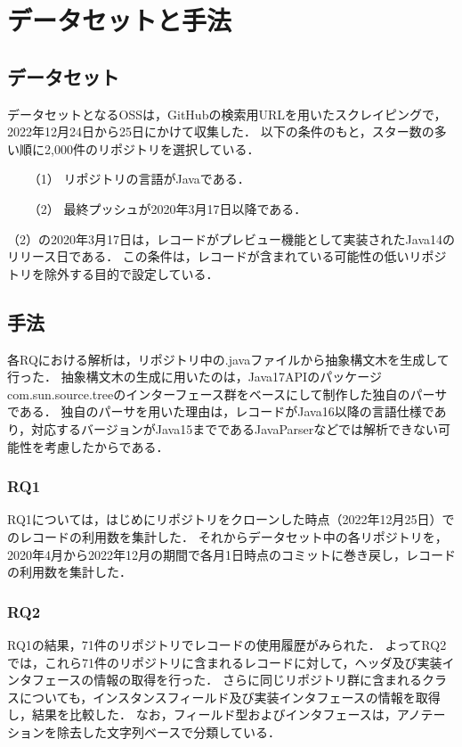 \section{データセットと手法\label{methodology}}

\subsection{データセット}
データセットとなるOSSは，GitHubの検索用URLを用いたスクレイピングで，2022年12月24日から25日にかけて収集した．
以下の条件のもと，スター数の多い順に2,000件のリポジトリを選択している．
\begin{itemize}
    \item[（1） ] リポジトリの言語がJavaである．
    \item[（2） ] 最終プッシュが2020年3月17日以降である．
\end{itemize}
（2）の2020年3月17日は，レコードがプレビュー機能として実装されたJava14のリリース日である．
この条件は，レコードが含まれている可能性の低いリポジトリを除外する目的で設定している．

\subsection{手法}
各RQにおける解析は，リポジトリ中の.javaファイルから抽象構文木を生成して行った．
抽象構文木の生成に用いたのは，Java17APIのパッケージcom.sun.source.treeのインターフェース群をベースにして制作した独自のパーサである．
独自のパーサを用いた理由は，レコードがJava16以降の言語仕様であり，対応するバージョンがJava15までであるJavaParserなどでは解析できない可能性を考慮したからである．

\subsubsection{RQ1\label{rq1_method}}
RQ1については，はじめにリポジトリをクローンした時点（2022年12月25日）でのレコードの利用数を集計した．
それからデータセット中の各リポジトリを，2020年4月から2022年12月の期間で各月1日時点のコミットに巻き戻し，レコードの利用数を集計した．

\subsubsection{RQ2\label{rq2_method}}
RQ1の結果，71件のリポジトリでレコードの使用履歴がみられた．
よってRQ2では，これら71件のリポジトリに含まれるレコードに対して，ヘッダ及び実装インタフェースの情報の取得を行った．
さらに同じリポジトリ群に含まれるクラスについても，インスタンスフィールド及び実装インタフェースの情報を取得し，結果を比較した．
なお，フィールド型およびインタフェースは，アノテーションを除去した文字列ベースで分類している．

